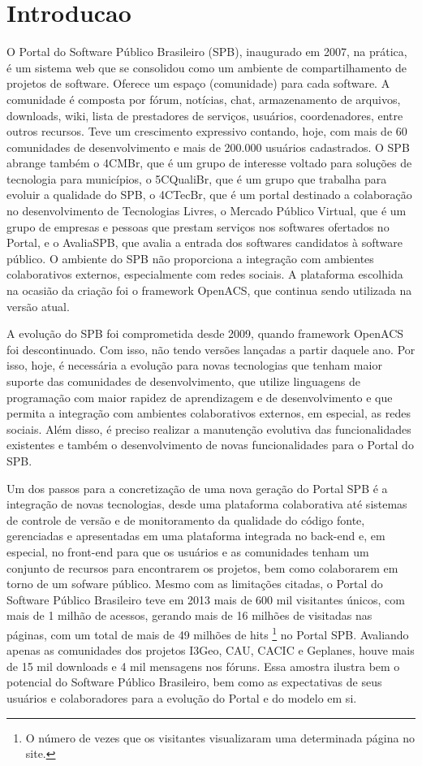 \section{Introducao}
\label{sec:introducao}

O Portal do Software Público Brasileiro (SPB), inaugurado em 2007, na prática,
é um sistema web que se consolidou como um ambiente de compartilhamento de
projetos de software.
%
Oferece um espaço (comunidade) para cada software. A comunidade é composta por
fórum, notícias, chat, armazenamento de arquivos, downloads, wiki, lista de
prestadores de serviços, usuários, coordenadores, entre outros recursos.
%
Teve um crescimento expressivo contando, hoje, com mais de 60 comunidades de
desenvolvimento e mais de 200.000 usuários cadastrados.
%
O SPB abrange também o 4CMBr, que é um grupo de interesse voltado para soluções
de tecnologia para municípios, o 5CQualiBr, que é um grupo que trabalha para
evoluir a qualidade do SPB, o 4CTecBr, que é um portal destinado a colaboração
no desenvolvimento de Tecnologias Livres, o Mercado Público Virtual, que é um
grupo de empresas e pessoas que prestam serviços nos softwares ofertados no
Portal, e o AvaliaSPB, que avalia a entrada dos softwares candidatos à software
público.
%
O ambiente do SPB não proporciona a integração com ambientes colaborativos
externos, especialmente com redes sociais. A plataforma escolhida na ocasião da
criação foi o framework OpenACS, que continua sendo utilizada na versão atual.


A evolução do SPB foi comprometida desde 2009, quando framework OpenACS foi 
descontinuado. Com isso, não tendo versões lançadas a partir daquele ano.
%
Por isso, hoje, é necessária a evolução para novas tecnologias que tenham maior
suporte das comunidades de desenvolvimento, que utilize linguagens de programação
com maior rapidez de aprendizagem e de desenvolvimento e que permita a integração
com ambientes colaborativos externos, em especial, as redes sociais.
%
Além disso, é preciso realizar a manutenção evolutiva das funcionalidades
existentes e também o desenvolvimento de novas funcionalidades para o Portal
do SPB.


Um dos passos para a concretização de uma nova geração do Portal SPB é a
integração de novas tecnologias, desde uma plataforma colaborativa até sistemas
de controle de versão e de monitoramento da qualidade do código fonte,
gerenciadas e apresentadas em uma plataforma integrada no back-end e, em especial,
no front-end para que os usuários e as comunidades tenham um conjunto de
recursos para encontrarem os projetos, bem como colaborarem em torno de um
sofware público.
%
Mesmo com as limitações citadas, o Portal do Software Público Brasileiro teve
em 2013 mais de 600 mil visitantes únicos, com mais de 1 milhão de acessos,
gerando mais de 16 milhões de visitadas nas páginas, com um total de mais de 49
milhões de hits \footnote{O número de vezes que os visitantes visualizaram uma
determinada página no site.} no Portal SPB.
%
Avaliando apenas as comunidades dos projetos I3Geo, CAU, CACIC e Geplanes, houve
mais de 15 mil downloads e 4 mil mensagens nos fóruns.
%
Essa amostra ilustra bem o potencial do Software Público Brasileiro, bem como
as expectativas de seus usuários e colaboradores para a evolução do Portal e
do modelo em si.


